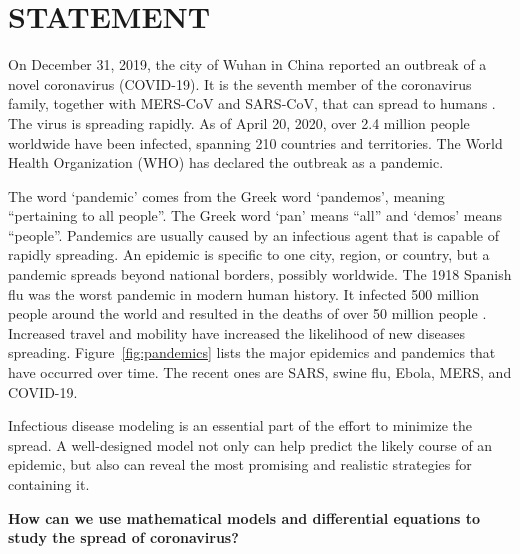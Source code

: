 \documentclass[10pt,letterpaper]{article}
\begin{document}
\section*{STATEMENT}
On December 31, 2019, the city of Wuhan in China reported an outbreak of a novel coronavirus (COVID-19). It is the seventh member of the coronavirus family, together with MERS-CoV and SARS-CoV, that can spread to humans \cite{CDC2020}. The virus is spreading rapidly. As of April 20, 2020, over 2.4 million people worldwide have been infected, spanning 210 countries and territories. The World Health Organization (WHO) has declared the outbreak as a pandemic. 

The word `pandemic' comes from the Greek word `pandemos', meaning ``pertaining to all people''. The Greek word `pan' means ``all'' and `demos' means ``people''. Pandemics are usually caused by an infectious agent that is capable of rapidly spreading. An epidemic is specific to one city, region, or country, but a pandemic spreads beyond national borders, possibly worldwide. The 1918 Spanish flu was the worst pandemic in modern human history. It infected 500 million people around the world and resulted in the deaths of over 50 million people \cite{CDC2019}. Increased travel and mobility have increased the likelihood of new diseases spreading. Figure~\ref{fig:pandemics} lists the major epidemics and pandemics that have occurred over time. The recent ones are SARS, swine flu, Ebola, MERS, and COVID-19.

Infectious disease modeling is an essential part of the effort to minimize the spread. A well-designed model not only can help predict the likely course of an epidemic, but also can reveal the most promising and realistic strategies for containing it.

{\bf How can we use mathematical models and differential equations to study the spread of coronavirus?}
\end{document}
